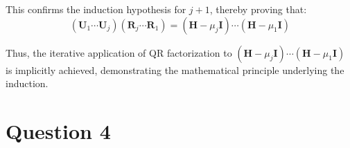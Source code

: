 \documentclass{article}
\begin{document}
This confirms the induction hypothesis for $j+1$, thereby proving that:
\begin{equation}
\left(\boldsymbol{U}_1 \cdots \boldsymbol{U}_j\right)\left(\boldsymbol{R}_j \cdots \boldsymbol{R}_1\right) = \left(\boldsymbol{H} - \mu_j \mathbf{I}\right) \cdots \left(\boldsymbol{H} - \mu_1 \mathbf{I}\right)
\end{equation}

Thus, the iterative application of QR factorization to $\left(\boldsymbol{H} - \mu_j \mathbf{I}\right) \cdots \left(\boldsymbol{H} - \mu_1 \mathbf{I}\right)$ is implicitly achieved, demonstrating the mathematical principle underlying the induction.

\section{Question 4}
\end{document}
